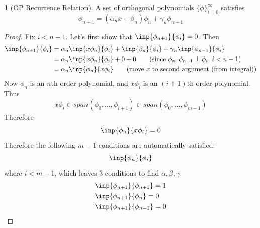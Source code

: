 \documentclass[12pt]{article}
\theoremstyle{definition}
\newtheorem{theorem}{\color{ForestGreen}{\textbf{Theorem}}}
\theoremstyle{definition}
\begin{document}
\begin{theorem}[OP Recurrence Relation]
	A set of orthogonal polynomials $\{\phi\}_{i=0}^\infty$ satisfies
	\begin{equation}
		\phi_{n+1} = (\alpha_n x + \beta_n)\phi_n + \gamma_n \phi_{n-1}
	\end{equation}
\end{theorem}
\begin{proof}
	Fix $i < n - 1$. Let's first show that $\inp{\phi_{n+1}}{\phi_i} = 0$. Then
	\begin{align*}
		\inp{\phi_{n+1}}{\phi_i} &= \alpha_n \inp{x\phi_n}{\phi_i} + \inp{\beta_n}{\phi_i} + \gamma_n \inp{\phi_{n-1}}{\phi_i} \\
		&= \alpha_n \inp{x\phi_n}{\phi_i} + 0 + 0 \tag{since $\phi_n, \phi_{n-1} \perp \phi_i$, $i < n-1$} \\
		&= \alpha_n \inp{\phi_n}{x \phi_i} \tag{move $x$ to second argument (from integral)} 
	\end{align*}
	Now $\phi_n$ is an $n$th order polynomial, and $x \phi_i$ is an $(i+1)$th order polynomial. Thus
	\begin{equation}
		x \phi_i \in span(\phi_0, \ldots, \phi_{i+1}) \in span(\phi_0, \ldots, \phi_{m-1})
	\end{equation}
	Therefore 
	\begin{equation}
		\inp{\phi_n}{x \phi_i} = 0
	\end{equation}
	Therefore the following $m-1$ conditions are automatically satisfied:
	\begin{equation}
		\inp{\phi_n}{\phi_i}
	\end{equation}
	where $i < m-1$, which leaves $3$ conditions to find $\alpha, \beta, \gamma$:
	\begin{align*}
		&\inp{\phi_{n+1}}{\phi_{n+1}} = 1 \\
		&\inp{\phi_{n+1}}{\phi_{n}} = 0 \\
		&\inp{\phi_{n+1}}{\phi_{n-1}} = 0
	\end{align*}
\end{proof}
\end{document}
